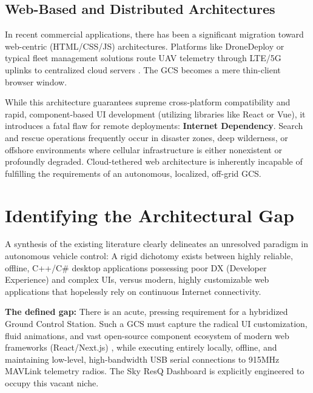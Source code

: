 \subsection{Web-Based and Distributed Architectures}
In recent commercial applications, there has been a significant migration toward web-centric (HTML/CSS/JS) architectures. Platforms like DroneDeploy or typical fleet management solutions route UAV telemetry through LTE/5G uplinks to centralized cloud servers \cite{nextjs}. The GCS becomes a mere thin-client browser window. 

While this architecture guarantees supreme cross-platform compatibility and rapid, component-based UI development (utilizing libraries like React or Vue), it introduces a fatal flaw for remote deployments: \textbf{Internet Dependency}. Search and rescue operations frequently occur in disaster zones, deep wilderness, or offshore environments where cellular infrastructure is either nonexistent or profoundly degraded. Cloud-tethered web architecture is inherently incapable of fulfilling the requirements of an autonomous, localized, off-grid GCS.

\section{Identifying the Architectural Gap}
A synthesis of the existing literature clearly delineates an unresolved paradigm in autonomous vehicle control: A rigid dichotomy exists between highly reliable, offline, C++/C\# desktop applications possessing poor DX (Developer Experience) and complex UIs, versus modern, highly customizable web applications that hopelessly rely on continuous Internet connectivity.

\textbf{The defined gap:} There is an acute, pressing requirement for a hybridized Ground Control Station. Such a GCS must capture the radical UI customization, fluid animations, and vast open-source component ecosystem of modern web frameworks (React/Next.js) \cite{nextjs}\cite{electronjs}, while executing entirely locally, offline, and maintaining low-level, high-bandwidth USB serial connections to 915MHz MAVLink telemetry radios. The Sky ResQ Dashboard is explicitly engineered to occupy this vacant niche.
